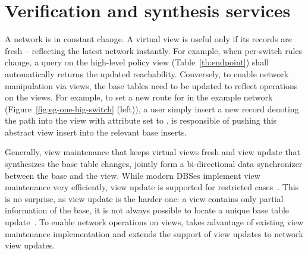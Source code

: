 \section{Verification and synthesis services}
\label{sec:veri-syn}



A network is in constant change. A virtual view is useful only if its
records are fresh -- reflecting the latest network instantly. For
example, when per-switch rules change, a query on the high-level
policy view  (Table~\ref{tb:endpoint}) shall
automatically returns the updated  reachability. Conversely,
to enable network manipulation via views, the base tables need to be
updated to reflect operations on the views.  For example, to set a new
route  for  in the example network
(Figure~\ref{fig:eg-one-big-switch} (left)), a user simply insert a new
record denoting the path into the  view with
 attribute set to . \Sys is responsible of pushing this
abstract view insert into the relevant base 
inserts.

Generally, view maintenance that keeps virtual views fresh and view
update that synthesizes the base table changes, jointly form a
bi-directional data synchronizer between the base and the view. While
modern DBSes implement view maintenance very efficiently, view update
is supported for restricted
cases~\cite{ak-view-udpate-thesis,relational-lenses}. This is no
surprise, as view update is the harder one: a view contains only partial
information of the base, it is not always possible to locate a unique
base table update~\cite{Bancilhon:view-update-semantics}. To enable
network operations on views, \Sys takes advantage of existing view
maintenance implementation and extends the support of view updates to
network view updates.

